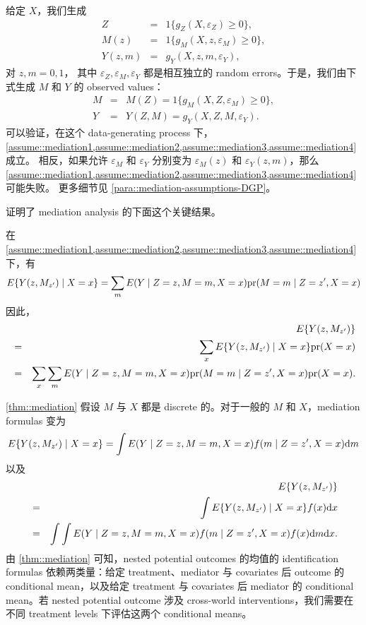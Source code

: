 \begin{example}
\label{eg::mediation-assumptions}
给定 $X$，我们生成
\begin{eqnarray*}
Z &=& 1\{  g_Z(X, \varepsilon_Z)  \geq 0 \} ,\\
M(z) &=& 1\{   g_M(X, z, \varepsilon_M)  \geq 0 \} ,\\
Y(z,m) &=& g_Y(X, z, m, \varepsilon_Y ),
\end{eqnarray*}
对 $z,m=0,1$，
其中
$
\varepsilon_Z, \varepsilon_M,
\varepsilon_Y 
$
都是相互独立的 random errors。于是，我们由下式生成 $M$ 和 $Y$ 的 observed values：
\begin{eqnarray*}
M &=& M(Z) = 1\{   g_M(X, Z, \varepsilon_M)  \geq 0 \},\\
Y &=& Y(Z,M) = g_Y(X, Z, M, \varepsilon_Y ) . 
\end{eqnarray*}
可以验证，在这个 data-generating process 下，\cref{assume::mediation1,assume::mediation2,assume::mediation3,assume::mediation4} 成立。
相反，如果允许 $\varepsilon_M$ 和 $\varepsilon_Y$ 分别变为 $\varepsilon_M(z)$ 和 $\varepsilon_Y(z,m)$，那么 \cref{assume::mediation1,assume::mediation2,assume::mediation3,assume::mediation4} 可能失败。
更多细节见 \cref{para::mediation-assumptions-DGP}。
\end{example}



\citet{Pearl::2001} 证明了 mediation analysis 的下面这个关键结果。

\begin{theorem}
\label{thm::mediation}
在 \cref{assume::mediation1,assume::mediation2,assume::mediation3,assume::mediation4} 下，有
$$
E\{ Y(z, M_{z'})  \mid X=x \} =  \sum_m E(Y\mid Z=z, M=m, X=x) \textup{pr}(M =  m \mid Z=z', X=x)   
$$
因此，
\begin{eqnarray*}
&&E\{ Y(z, M_{z'})   \}  \\
&=&  \sum_x E\{ Y(z, M_{z'})  \mid X=x \} \textup{pr}(X =  x )  \\
&=&  \sum_x \sum_m E(Y\mid Z=z, M=m, X=x) \textup{pr}(M =  m \mid Z=z', X=x)   \textup{pr}(X =  x ).
\end{eqnarray*}
\end{theorem}

 

\cref{thm::mediation} 假设 $M$ 与 $X$ 都是 discrete 的。对于一般的 $M$ 和 $X$，mediation formulas 变为
$$
E\{ Y(z, M_{z'}) \mid X=x  \} =   \int  E(Y\mid Z=z, M=m, X=x) f ( m \mid Z=z', X=x) \textnormal{d} m
$$
以及
\begin{eqnarray*}
&&E\{ Y(z, M_{z'})   \}  \\
 &=& \int E\{ Y(z, M_{z'}) \mid X=x  \}   f  (x) \textnormal{d} x  \\
 &=& \int \int  E(Y\mid Z=z, M=m, X=x) f ( m \mid Z=z', X=x)     f  (x) \textnormal{d} m \textnormal{d} x   . 
\end{eqnarray*}
由 \cref{thm::mediation} 可知，nested potential outcomes 的均值的 identification formulas 依赖两类量：给定 treatment、mediator 与 covariates 后 outcome 的 conditional mean，以及给定 treatment 与 covariates 后 mediator 的 conditional mean。若 nested potential outcome 涉及 cross-world interventions，我们需要在不同 treatment levels 下评估这两个 conditional means。

